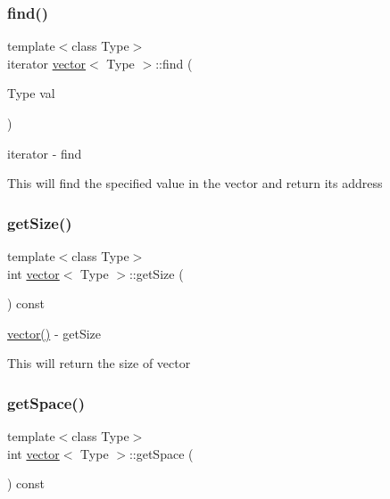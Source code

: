 \subsubsection{\texorpdfstring{find()}{find()}}
{\footnotesize\ttfamily template$<$class Type$>$ \\
iterator \hyperlink{classvector}{vector}$<$ Type $>$\+::find (\begin{DoxyParamCaption}\item[{Type}]{val }\end{DoxyParamCaption})\hspace{0.3cm}{\ttfamily [inline]}}



iterator -\/ find 

This will find the specified value in the vector and return its address \hypertarget{classvector_a0c650d6f1411947dc6a407c4adde5109}{}\label{classvector_a0c650d6f1411947dc6a407c4adde5109} 
\subsubsection{\texorpdfstring{get\+Size()}{getSize()}}
{\footnotesize\ttfamily template$<$class Type$>$ \\
int \hyperlink{classvector}{vector}$<$ Type $>$\+::get\+Size (\begin{DoxyParamCaption}{ }\end{DoxyParamCaption}) const\hspace{0.3cm}{\ttfamily [inline]}}



\hyperlink{classvector_ab8d8ebaa9b91a05bb7a94371cb84c042}{vector()} -\/ get\+Size 

This will return the size of vector \hypertarget{classvector_a9f64c11bb3348e2d1c5c4f41ae15780f}{}\label{classvector_a9f64c11bb3348e2d1c5c4f41ae15780f} 
\subsubsection{\texorpdfstring{get\+Space()}{getSpace()}}
{\footnotesize\ttfamily template$<$class Type$>$ \\
int \hyperlink{classvector}{vector}$<$ Type $>$\+::get\+Space (\begin{DoxyParamCaption}{ }\end{DoxyParamCaption}) const\hspace{0.3cm}{\ttfamily [inline]}}



